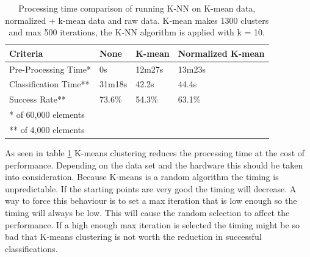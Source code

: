 \begin{table}[H]
\centering

\begin{tabular}{|l|p{2cm}|p{2cm}|p{2cm}|}\hline
Criteria              & None   & K-mean & Normalized K-mean \\ \hline
Pre-Processing Time*  & 0s     & 12m27s & 13m23s            \\ \hline
Classification Time** & 31m18s & 42.2s  & 44.4s             \\ \hline
Success Rate**        & 73.6\% & 54.3\% & 63.1\%            \\ \hline
\multicolumn{4}{|l|}{* of 60,000 elements} \\ 
\multicolumn{4}{|l|}{** of 4,000 elements} \\ \hline
\end{tabular}

\caption{Processing time comparison of running K-NN on K-mean data, normalized + k-mean data and raw data. K-mean makes 1300 clusters and max 500 iterations, the K-NN algorithm is applied with k = 10.}
\label{tab:processingtime_kmean_vs_raw_knn}
\end{table}

As seen in table \ref{tab:processingtime_kmean_vs_raw_knn} K-means clustering reduces the processing time at the cost of performance. 
Depending on the data set and the hardware this should be taken into consideration. 
Because K-means is a random algorithm the timing is unpredictable. If the starting points are very good the timing will decrease. 
A way to force this behaviour is to set a max iteration that is low enough so the timing will always be low.
This will cause the random selection to affect the performance. 
If a high enough max iteration is selected the timing might be so bad that K-means clustering is not worth the reduction in successful classifications.